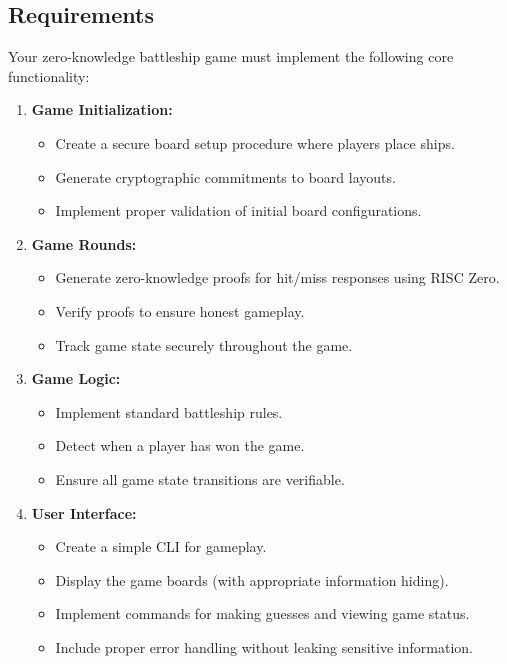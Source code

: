 \documentclass[10pt,a4paper,american]{exam}
\begin{document}
\subsection*{Requirements}
Your zero-knowledge battleship game must implement the following core functionality:

\begin{enumerate}
	\item \textbf{Game Initialization:}
	      \begin{itemize}
		      \item Create a secure board setup procedure where players place ships.
		      \item Generate cryptographic commitments to board layouts.
		      \item Implement proper validation of initial board configurations.
	      \end{itemize}

	\item \textbf{Game Rounds:}
	      \begin{itemize}
		      \item Generate zero-knowledge proofs for hit/miss responses using RISC Zero.
		      \item Verify proofs to ensure honest gameplay.
		      \item Track game state securely throughout the game.
	      \end{itemize}

	\item \textbf{Game Logic:}
	      \begin{itemize}
		      \item Implement standard battleship rules.
		      \item Detect when a player has won the game.
		      \item Ensure all game state transitions are verifiable.
	      \end{itemize}

	\item \textbf{User Interface:}
	      \begin{itemize}
		      \item Create a simple CLI for gameplay.
		      \item Display the game boards (with appropriate information hiding).
		      \item Implement commands for making guesses and viewing game status.
		      \item Include proper error handling without leaking sensitive information.
	      \end{itemize}
\end{enumerate}
\end{document}
